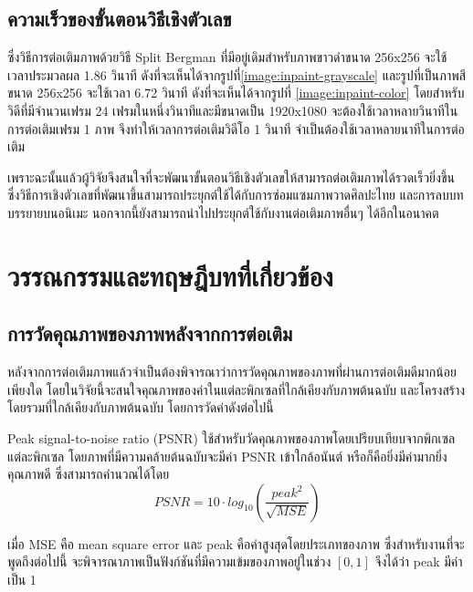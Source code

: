\documentclass[hidelinks,a4paper,14pt]{article}
\numberwithin{equation}{section}							%
\begin{document}
{		 %
		 \subsection{ความเร็วของขั้นตอนวิธีเชิงตัวเลข}
		 \hspace{1cm}ซึ่งวิธีการต่อเติมภาพด้วยวิธี Split Bergman ที่มีอยู่เดิมสำหรับภาพขาวดำขนาด 256x256 จะใช้เวลาประมวลผล 1.86 วินาที ดังที่จะเห็นได้จากรูปที่\ref{image:inpaint-grayscale} และรูปที่เป็นภาพสีขนาด 256x256 จะใช้เวลา 6.72 วินาที ดังที่จะเห็นได้จากรูปที่ \ref{image:inpaint-color} โดยสำหรับวิดีที่มีจำนวนเฟรม 24 เฟรมในหนึ่งวินาทีและมีขนาดเป็น 1920x1080 จะต้องใช้เวลาหลายวินาทีในการต่อเติมเฟรม 1 ภาพ จึงทำให้เวลาการต่อเติมวิดีโอ 1 วินาที จำเป็นต้องใช้เวลาหลายนาทีในการต่อเติม
		 
		 \hspace{1cm}เพราะฉะนั้นแล้วผู้วิจัยจึงสนใจที่จะพัฒนาขั้นตอนวิธีเชิงตัวเลขให้สามารถต่อเติมภาพได้รวดเร็วยิ่งขึ้น ซึ่งวิธีการเชิงตัวเลขที่พัฒนาขึ้นสามารถประยุกต์ใช้ได้กับการซ่อมแซมภาพวาดศิลปะไทย และการลบบทบรรยายบนอนิเมะ นอกจากนี้ยังสามารถนำไปประยุกต์ใช้กับงานต่อเติมภาพอื่นๆ ได้อีกในอนาคต
		 
\section{วรรณกรรมและทฤษฎีบทที่เกี่ยวข้อง}
 \subsection{การวัดคุณภาพของภาพหลังจากการต่อเติม}
	\hspace{1cm} หลังจากการต่อเติมภาพแล้วจำเป็นต้องพิจารณาว่าการวัดคุณภาพของภาพที่ผ่านการต่อเติมดีมากน้อยเพียงใด โดยในวิจัยนี้จะสนใจคุณภาพของค่าในแต่ละพิกเซลที่ใกล้เคียงกับภาพต้นฉบับ และโครงสร้างโดยรวมที่ใกล้เคียงกับภาพต้นฉบับ โดยการวัดค่าดังต่อไปนี้
	
	\hspace{1cm}  Peak signal-to-noise ratio (PSNR)\cite{ref:PSNR} ใช้สำหรับวัดคุณภาพของภาพโดยเปรียบเทียบจากพิกเซลแต่ละพิกเซล โดยภาพที่มีความคล้ายต้นฉบับจะมีค่า PSNR เข้าใกล้อนันต์ หรือก็คือยิ่งมีค่ามากยิ่งคุณภาพดี ซึ่งสามารถคำนวณได้โดย
	$$ PSNR = 10 \cdot log_{10} ( \frac{{peak}^2}{\sqrt{MSE}} )$$
	
	เมื่อ MSE คือ mean square error และ peak คือค่าสูงสุดโดยประเภทของภาพ ซึ่งสำหรับงานที่จะพูดถึงต่อไปนี้ จะพิจารณาภาพเป็นฟังก์ชันที่มีความเข้มของภาพอยู่ในช่วง $ [0,1] $ จึงได้ว่า peak มีค่าเป็น 1

}
\end{document}
